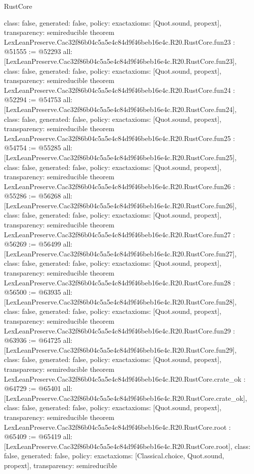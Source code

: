 \begin{lexlean}{RustCore}
\begin{coremodule}
{  class: false,
  generated: false,
  policy: exact{axioms: [Quot.sound, propext]},
  transparency: semireducible
}
theorem LexLeanPreserve.Cac32f86b04c5a5e4c84d9f46beb16e4c.R20.RustCore.fun23 : @51555 := @52293 {
  all: [LexLeanPreserve.Cac32f86b04c5a5e4c84d9f46beb16e4c.R20.RustCore.fun23],
  class: false,
  generated: false,
  policy: exact{axioms: [Quot.sound, propext]},
  transparency: semireducible
}
theorem LexLeanPreserve.Cac32f86b04c5a5e4c84d9f46beb16e4c.R20.RustCore.fun24 : @52294 := @54753 {
  all: [LexLeanPreserve.Cac32f86b04c5a5e4c84d9f46beb16e4c.R20.RustCore.fun24],
  class: false,
  generated: false,
  policy: exact{axioms: [Quot.sound, propext]},
  transparency: semireducible
}
theorem LexLeanPreserve.Cac32f86b04c5a5e4c84d9f46beb16e4c.R20.RustCore.fun25 : @54754 := @55285 {
  all: [LexLeanPreserve.Cac32f86b04c5a5e4c84d9f46beb16e4c.R20.RustCore.fun25],
  class: false,
  generated: false,
  policy: exact{axioms: [Quot.sound, propext]},
  transparency: semireducible
}
theorem LexLeanPreserve.Cac32f86b04c5a5e4c84d9f46beb16e4c.R20.RustCore.fun26 : @55286 := @56268 {
  all: [LexLeanPreserve.Cac32f86b04c5a5e4c84d9f46beb16e4c.R20.RustCore.fun26],
  class: false,
  generated: false,
  policy: exact{axioms: [Quot.sound, propext]},
  transparency: semireducible
}
theorem LexLeanPreserve.Cac32f86b04c5a5e4c84d9f46beb16e4c.R20.RustCore.fun27 : @56269 := @56499 {
  all: [LexLeanPreserve.Cac32f86b04c5a5e4c84d9f46beb16e4c.R20.RustCore.fun27],
  class: false,
  generated: false,
  policy: exact{axioms: [Quot.sound, propext]},
  transparency: semireducible
}
theorem LexLeanPreserve.Cac32f86b04c5a5e4c84d9f46beb16e4c.R20.RustCore.fun28 : @56500 := @63935 {
  all: [LexLeanPreserve.Cac32f86b04c5a5e4c84d9f46beb16e4c.R20.RustCore.fun28],
  class: false,
  generated: false,
  policy: exact{axioms: [Quot.sound, propext]},
  transparency: semireducible
}
theorem LexLeanPreserve.Cac32f86b04c5a5e4c84d9f46beb16e4c.R20.RustCore.fun29 : @63936 := @64725 {
  all: [LexLeanPreserve.Cac32f86b04c5a5e4c84d9f46beb16e4c.R20.RustCore.fun29],
  class: false,
  generated: false,
  policy: exact{axioms: [Quot.sound, propext]},
  transparency: semireducible
}
theorem LexLeanPreserve.Cac32f86b04c5a5e4c84d9f46beb16e4c.R20.RustCore.crate_ok : @64729 := @65401 {
  all: [LexLeanPreserve.Cac32f86b04c5a5e4c84d9f46beb16e4c.R20.RustCore.crate_ok],
  class: false,
  generated: false,
  policy: exact{axioms: [Quot.sound, propext]},
  transparency: semireducible
}
theorem LexLeanPreserve.Cac32f86b04c5a5e4c84d9f46beb16e4c.R20.RustCore.root : @65409 := @65419 {
  all: [LexLeanPreserve.Cac32f86b04c5a5e4c84d9f46beb16e4c.R20.RustCore.root],
  class: false,
  generated: false,
  policy: exact{axioms: [Classical.choice, Quot.sound, propext]},
  transparency: semireducible
}


\end{coremodule}
\end{lexlean}
